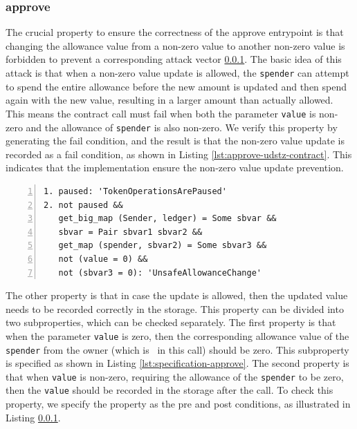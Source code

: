 \documentclass[a4paper,UKenglish,cleveref, autoref, thm-restate]{lipics-v2021}
\begin{document}
\subsubsection{approve}
The crucial property to ensure the correctness of the approve entrypoint is that changing the allowance value from a non-zero value to another non-zero value is forbidden to prevent a corresponding attack vector \ref{}. The basic idea of this attack is that when a non-zero value update is allowed, the \lstinline/spender/ can attempt to spend the entire allowance before the new amount is updated and then spend again with the new value, resulting in a larger amount than actually allowed. This means the contract call must fail when both the parameter \lstinline/value/ is non-zero and the allowance of \lstinline/spender/ is also non-zero. We verify this property by generating the fail condition, and the result is that the non-zero value update is recorded as a fail condition, as shown in Listing \ref{lst:approve-udstz-contract}. This indicates that the implementation ensure the non-zero value update prevention.
\begin{lstlisting}[float,captionpos=b,caption={Fail conditions for the \lstinline/approve/ entrypoint},label={lst:approve-udstz-contract},numbers=left]
1. paused: 'TokenOperationsArePaused'
2. not paused &&
   get_big_map (Sender, ledger) = Some sbvar &&
   sbvar = Pair sbvar1 sbvar2 &&
   get_map (spender, sbvar2) = Some sbvar3 &&
   not (value = 0) &&
   not (sbvar3 = 0): 'UnsafeAllowanceChange'
\end{lstlisting}
The other property is that in case the update is allowed, then the updated value needs to be recorded correctly in the storage. This property can be divided into two subproperties, which can be checked separately. The first property is that when the parameter \lstinline/value/ is zero, then the corresponding allowance value of the \lstinline/spender/ from the owner (which is \SENDER\ in this call) should be zero. This subproperty is specified as shown in Listing \ref{lst:specification-approve}. The second property is that when \lstinline/value/ is non-zero, requiring the allowance of the \lstinline/spender/ to be zero, then the \lstinline/value/ should be recorded in the storage after the call. To check this property, we specify the property as the pre and post conditions, as illustrated in Listing \ref{}.
\end{document}
